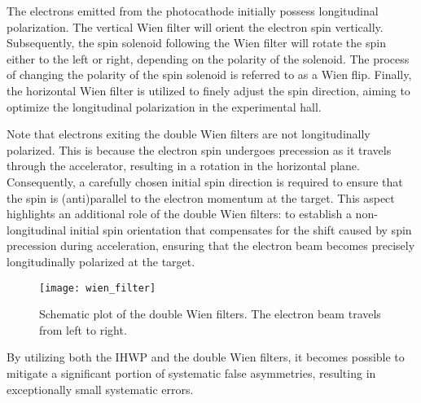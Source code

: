 The electrons emitted from the photocathode initially possess longitudinal polarization.
The vertical Wien filter will orient the electron spin vertically. Subsequently, the spin solenoid following the Wien filter will rotate the spin either to the left or right, depending on the polarity of the solenoid. The process of changing the polarity of the spin solenoid is referred to as a Wien flip. Finally, the horizontal Wien filter is utilized to finely adjust the spin direction, aiming to optimize the longitudinal polarization in the experimental hall. 

Note that electrons exiting the double Wien filters are not longitudinally polarized.
This is because the electron spin undergoes precession as it travels through the accelerator, 
resulting in a rotation in the horizontal plane. Consequently, a carefully chosen initial spin direction is required to ensure that the spin is (anti)parallel to the electron momentum at the target.
This aspect highlights an additional role of the double Wien filters: to establish a non-longitudinal initial spin orientation that compensates for the shift caused by spin precession during acceleration, ensuring that the electron beam becomes precisely longitudinally polarized at the target.
\begin{figure}[!h]
    \centering
    \texttt{[image: wien\_filter]}
    \caption{Schematic plot of the double Wien filters. The electron beam travels from left
    to right. \cite{osti_1059486}}
    \label{fig:double_wien_filters}
\end{figure}

By utilizing both the IHWP and the double Wien filters, it becomes possible to mitigate a significant portion of systematic false asymmetries, resulting in exceptionally small systematic errors.
\begin{comment}
    IHWP
    \begin{itemize}
	\item Cancels electronic cross talk and Pockels Cell steering
	\item Residual linear polarization effects do not cancel
	\item Spot size asymmetry, which we cannot measure, does not cancel
    \end{itemize}

    Wine filters and solenoid
    \begin{itemize}
	\item Cancels all helicity-correlated beam asymmetries from Injector including spot size
    \end{itemize}
\end{comment}

